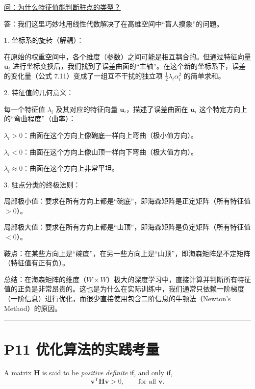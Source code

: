 \documentclass{article}
\begin{document}
{\color{blue}
\underline{问：为什么特征值能判断驻点的类型？}

答：我们这里巧妙地用线性代数解决了在高维空间中“盲人摸象”的问题。

1. 坐标系的旋转（解耦）：

在原始的权重空间中，各个维度（参数）之间可能是相互耦合的。但通过特征向量 $\mathbf{u}_i$ 进行坐标变换后，我们找到了误差曲面的“主轴”。在这个新的坐标系下，误差的变化量（公式 7.11）变成了一组互不干扰的独立项 $\frac{1}{2} \lambda_i \alpha_i^2$ 的简单求和。

2. 特征值的几何意义：

每一个特征值 $\lambda_i$ 及其对应的特征向量 $\mathbf{u}_i$，描述了误差曲面在 $\mathbf{u}_i$ 这个特定方向上的“弯曲程度”（曲率）：

$\lambda_i > 0$：曲面在这个方向上像碗底一样向上弯曲（极小值方向）。

$\lambda_i < 0$：曲面在这个方向上像山顶一样向下弯曲（极大值方向）。

$\lambda_i \approx 0$：曲面在这个方向上非常平坦。

3. 驻点分类的终极法则：

局部极小值：要求在所有方向上都是“碗底”，即海森矩阵是正定矩阵（所有特征值 $> 0$）。

局部极大值：要求在所有方向上都是“山顶”，即海森矩阵是负定矩阵（所有特征值 $< 0$）。
   
鞍点：在某些方向上是“碗底”，在另一些方向上是“山顶”，即海森矩阵是不定矩阵（特征值有正有负）。

总结：在海森矩阵的维度（$W \times W$）极大的深度学习中，直接计算并判断所有特征值的正负是非常昂贵的。这也是为什么在实际训练中，我们通常只依赖一阶梯度（一阶信息）进行优化，而很少直接使用包含二阶信息的牛顿法（Newton's Method）的原因。


}

\noindent\rule{\linewidth}{0.4pt}
 
\section{P11 优化算法的实践考量}

A matrix $\mathbf{H}$ is said to be \underline{\emph{positive definite}} if, and only if,
\begin{equation}
\mathbf{v}^\mathrm{T} \mathbf{H} \mathbf{v} > 0, \qquad \text{for all } \mathbf{v}.
\tag{7.12}
\end{equation}
\end{document}
